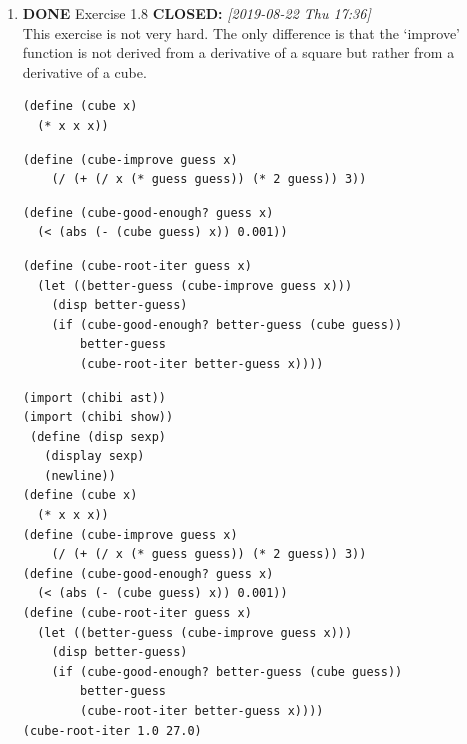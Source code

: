 \documentclass[11pt]{article}
\begin{document}
\begin{enumerate}
\begin{enumerate}
\begin{lstlisting}
(define (sqrt-iter guess x)
 (let ((better-guess (improve guess x)))
  (if (good-enough? guess (square better-guess))
      better-guess
      (sqrt-iter better-guess x))))
(define (good-enough? guess x)
  (< (abs (- (square guess) x)) 0.001))
(define (improve guess x)
  (average guess (/ x guess)))
(define (average x y)
  (/ (+ x y) 2))
(define (sqrt x)
  (sqrt-iter 1.0 x))

(square (sqrt 0.0004))
\end{lstlisting}

Works faster and gives a better result. Seemingly. QED\footnote{This exercise took me 7 hours.}.

\item {\bfseries\sffamily DONE} Exercise 1.8
\label{sec:org937143e}
\noindent\textbf{CLOSED:} \textit{[2019-08-22 Thu 17:36]}\\

This exercise is not very hard. The only difference is that the
`improve' function is not derived from a derivative of a square but
rather from a derivative of a cube.

\lstset{language=Lisp,label=orge4c07f7,caption= ,captionpos=b,numbers=none}
\begin{lstlisting}
(define (cube x)
  (* x x x))
\end{lstlisting}

\lstset{language=Lisp,label=orgcf8e623,caption= ,captionpos=b,numbers=none}
\begin{lstlisting}
(define (cube-improve guess x)
    (/ (+ (/ x (* guess guess)) (* 2 guess)) 3))
\end{lstlisting}

\lstset{language=Lisp,label=orgf09b74f,caption= ,captionpos=b,numbers=none}
\begin{lstlisting}
(define (cube-good-enough? guess x)
  (< (abs (- (cube guess) x)) 0.001))
\end{lstlisting}

\lstset{language=Lisp,label=org1bd49a1,caption= ,captionpos=b,numbers=none}
\begin{lstlisting}
(define (cube-root-iter guess x)
  (let ((better-guess (cube-improve guess x)))
    (disp better-guess)
    (if (cube-good-enough? better-guess (cube guess))
        better-guess
        (cube-root-iter better-guess x))))
\end{lstlisting}

\lstset{language=Lisp,label=orgdc60fc9,caption= ,captionpos=b,numbers=none}
\begin{lstlisting}
(import (chibi ast))
(import (chibi show))
 (define (disp sexp)
   (display sexp)
   (newline))
(define (cube x)
  (* x x x))
(define (cube-improve guess x)
    (/ (+ (/ x (* guess guess)) (* 2 guess)) 3))
(define (cube-good-enough? guess x)
  (< (abs (- (cube guess) x)) 0.001))
(define (cube-root-iter guess x)
  (let ((better-guess (cube-improve guess x)))
    (disp better-guess)
    (if (cube-good-enough? better-guess (cube guess))
        better-guess
        (cube-root-iter better-guess x))))
(cube-root-iter 1.0 27.0)
\end{lstlisting}


\end{enumerate}
\end{enumerate}
\end{document}
